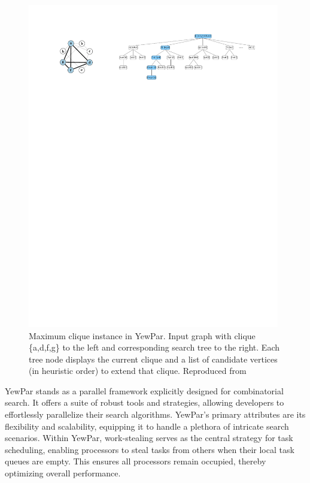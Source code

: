 \documentclass{mproj}
\begin{document}
\begin{figure}[h]
    \centering
    \includegraphics[width=0.98\textwidth]{images/yewpar_maxclique.pdf}
    \caption{Maximum clique instance in YewPar. Input graph with clique \{a,d,f,g\} to the left and corresponding search tree to the right. Each tree node displays the current clique and a list of candidate vertices (in heuristic order) to extend that clique. Reproduced from \cite{10.1145/3332466.3374537}}
    \label{fig:yewpar_maxclique}
\end{figure}
\FloatBarrier

YewPar stands as a parallel framework explicitly designed for combinatorial search.
It offers a suite of robust tools and strategies, allowing developers to effortlessly parallelize their search algorithms.
YewPar's primary attributes are its flexibility and scalability,
equipping it to handle a plethora of intricate search scenarios.
Within YewPar, work-stealing serves as the central strategy for task scheduling,
enabling processors to steal tasks from others when their local task queues are empty.
This ensures all processors remain occupied, thereby optimizing overall performance.
\end{document}
